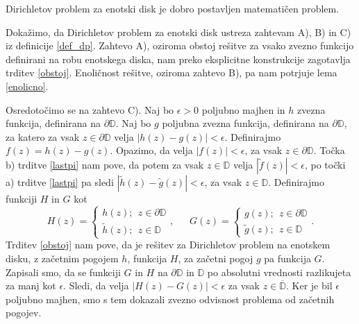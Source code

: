 \documentclass[mat1, tisk]{fmfdelo}
\begin{document}
    \begin{posledica}
        Dirichletov problem za enotski disk je dobro postavljen matematičen problem. 
    \end{posledica}
    \begin{dokaz}
        Dokažimo, da Dirichletov problem za enotski disk ustreza zahtevam A), B) in C) iz definicije \ref{def_dp}.
        Zahtevo A), oziroma obstoj rešitve za vsako zvezno funkcijo definirani na robu enotskega diska, nam preko eksplicitne konstrukcije zagotavlja trditev \ref{obstoj}. Enoličnost rešitve, oziroma zahtevo B), pa nam potrjuje lema \ref{enolicno}. 
        
        Osredotočimo se na zahtevo C). 
        Naj bo $\epsilon > 0$ poljubno majhen in $h$ zvezna funkcija, definirana na $\partial \mathbb{D}$. 
        Naj bo $g$ poljubna zvezna funkcija, definirana na $\partial \mathbb{D}$, za katero za vsak $z \in \partial \mathbb{D}$ velja $|h(z) - g(z)| < \epsilon$. 
        Definirajmo \mbox{$f(z) = h(z) - g(z)$}. Opazimo, da velja $|f(z)| < \epsilon$, za vsak $z \in \partial \mathbb{D}$. Točka b) trditve \ref{lastpi} nam pove, da potem za vsak $z \in \mathbb{D}$ velja $|\widetilde{f}(z)| < \epsilon$, po točki a) trditve \ref{lastpi} pa sledi \mbox{$|\widetilde{h}(z) - \widetilde{g}(z)| < \epsilon$}, za vsak $z \in \mathbb{D}$.
        Definirajmo funkciji $H$ in $G$ kot
        $$
            H(z) = \begin{cases}
                    h(z);~~z \in \partial \mathbb{D}\\
                    \widetilde{h}(z);~~z \in \mathbb{D}
            \end{cases},~~~~~~~
            G(z) = \begin{cases}
                g(z);~~z \in \partial \mathbb{D}\\
                \widetilde{g}(z);~~z \in \mathbb{D}
            \end{cases}.
        $$
        Trditev \ref{obstoj} nam pove, da je rešitev za Dirichletov problem na enotskem disku, z začetnim pogojem $h$, funkcija $H$, za začetni pogoj $g$ pa funkcija $G$.
        Zapisali smo, da se funkciji $G$ in $H$ na $\partial \mathbb{D}$ in $\mathbb{D}$ po absolutni vrednosti razlikujeta za manj kot $\epsilon$. Sledi, da velja $|H(z) - G(z)| < \epsilon$ za vsak $z \in \overline{\mathbb{D}}$.     
        Ker je bil $\epsilon$ poljubno majhen, smo s tem dokazali zvezno odvisnost problema od začetnih pogojev.
    \end{dokaz}
\end{document}
